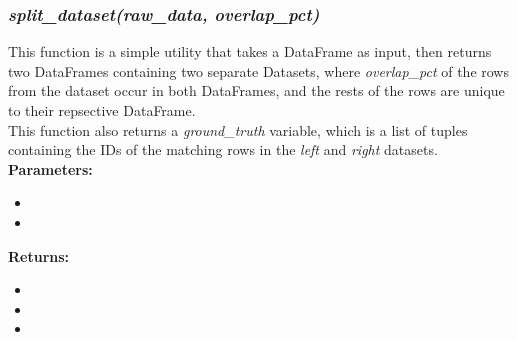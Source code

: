 \documentclass[titlepage, 11pt]{article}
\begin{document}
\subsubsection{\textit{split\_dataset(raw\_data, overlap\_pct)}}
This function is a simple utility that takes a DataFrame as input, then returns two DataFrames containing two separate Datasets, where \textit{overlap\_pct} of the rows from the dataset occur in both DataFrames, and the rests of the rows are unique to their repsective DataFrame.
\\
This function also returns a \textit{ground\_truth} variable, which is a list of tuples containing the IDs of the matching rows in the \textit{left} and \textit{right} datasets.
\\
\textbf{Parameters:}
\begin{itemize}
    \item {}
    \item {}
\end{itemize}
\textbf{Returns:}
\begin{itemize}
    \item {}
    \item {}
    \item {}
\end{itemize}
\end{document}

